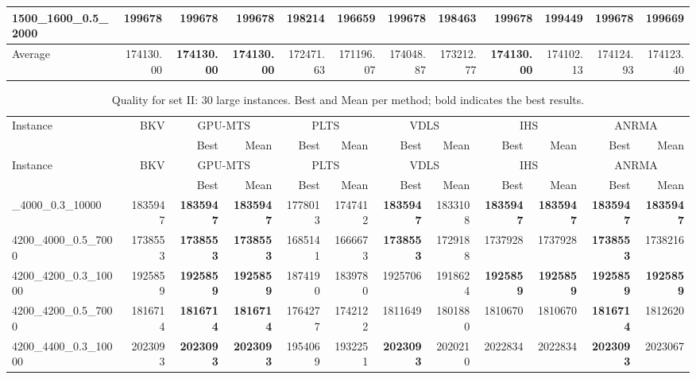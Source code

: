 \begin{landscape}
\begin{longtable}{lrrrrrrrrrrr}
1500\_1600\_0.5\_2000 & 199678 & \textbf{199678} & \textbf{199678} & 198214 & 196659 & \textbf{199678} & 198463 & \textbf{199678} & 199449 & \textbf{199678} & 199669\\
\midrule
Average & 174130.00 & \textbf{174130.00} & \textbf{174130.00} & 172471.63 & 171196.07 & 174048.87 & 173212.77 & \textbf{174130.00} & 174102.13 & 174124.93 & 174123.40\\
\end{longtable}\endgroup\clearpage
\begingroup\fontsize{9}{10.5}\selectfont\setlength{\tabcolsep}{2.5pt}\renewcommand{\arraystretch}{.88}
\begin{longtable}{lrrrrrrrrrrr}
\caption{{Quality for set II: 30 large instances. Best and Mean per method; bold indicates the best results.}}\label{tab:full-c2-large}\\
\toprule
Instance & BKV & \multicolumn{2}{c}{GPU-MTS} & \multicolumn{2}{c}{PLTS} & \multicolumn{2}{c}{VDLS} & \multicolumn{2}{c}{IHS} & \multicolumn{2}{c}{ANRMA}\\
 &  & Best & Mean & Best & Mean & Best & Mean & Best & Mean & Best & Mean\\
\midrule\endfirsthead
Instance & BKV & \multicolumn{2}{c}{GPU-MTS} & \multicolumn{2}{c}{PLTS} & \multicolumn{2}{c}{VDLS} & \multicolumn{2}{c}{IHS} & \multicolumn{2}{c}{ANRMA}\\
 &  & Best & Mean & Best & Mean & Best & Mean & Best & Mean & Best & Mean\\
\midrule\endhead
\bottomrule\endlastfoot
4200\_4000\_0.3\_10000 & 1835947 & \textbf{1835947} & \textbf{1835947} & 1778013 & 1747412 & \textbf{1835947} & 1833108 & \textbf{1835947} & \textbf{1835947} & \textbf{1835947} & \textbf{1835947}\\
4200\_4000\_0.5\_7000 & 1738553 & \textbf{1738553} & \textbf{1738553} & 1685141 & 1666673 & \textbf{1738553} & 1729188 & 1737928 & 1737928 & \textbf{1738553} & 1738216\\
4200\_4200\_0.3\_10000 & 1925859 & \textbf{1925859} & \textbf{1925859} & 1874190 & 1839780 & 1925706 & 1918624 & \textbf{1925859} & \textbf{1925859} & \textbf{1925859} & \textbf{1925859}\\
4200\_4200\_0.5\_7000 & 1816714 & \textbf{1816714} & \textbf{1816714} & 1764277 & 1742122 & 1811649 & 1801880 & 1810670 & 1810670 & \textbf{1816714} & 1812620\\
4200\_4400\_0.3\_10000 & 2023093 & \textbf{2023093} & \textbf{2023093} & 1954069 & 1932251 & \textbf{2023093} & 2020210 & 2022834 & 2022834 & \textbf{2023093} & 2023067\\

\end{longtable}
\end{landscape}
